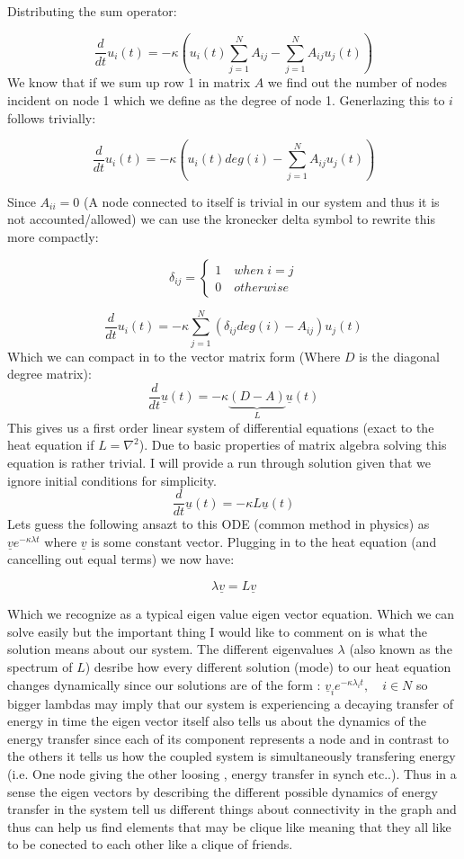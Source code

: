 \documentclass[10pt,twocolumn]{article}
\begin{document}
Distributing the sum operator:

\[
\frac{d}{dt}u_{i}(t) = -\kappa \left( u_{i}(t) \sum_{j=1}^{N}A_{ij}-  \sum_{j=1}^{N}A_{ij}u_{j}(t) \right )
\]
We know that if we sum up row 1 in matrix $A$ we find out the number of nodes incident on node 1 which we define as the degree of node 1. Generlazing this to $i$ follows trivially:

\[
\frac{d}{dt}u_{i}(t) = -\kappa \left( u_{i}(t) deg(i)-  \sum_{j=1}^{N}A_{ij}u_{j}(t) \right )
\]

Since $A_{ii}=0$  (A node connected to itself is trivial in our system and thus it is not accounted/allowed) we can use the kronecker delta symbol to rewrite this more compactly:

\[ \delta_{ij} = \begin{cases} 
   1 \quad when \; i = j \\
   0 \quad otherwise 
   \end{cases}
\]

\[
\frac{d}{dt}u_{i}(t) = -\kappa \sum_{j=1}^{N}(\delta_{ij} deg(i) -A_{ij})u_{j}(t)
\]
Which we can compact in to the vector matrix form (Where $D$ is the diagonal degree matrix):
\[
\frac{d}{dt}\underline{u}(t) = -\kappa\underbrace{(D -A)}_{L}\underline{u}(t)
\]
This gives us a first order linear system of differential equations (exact to the heat equation if $L = \nabla^{2}$). Due to basic properties of matrix algebra solving this equation is rather trivial. I will provide a run through solution given that we ignore initial conditions for simplicity.
\[
\frac{d}{dt}\underline{u}(t) = -\kappa L\underline{u}(t)
\]
Lets guess the following ansazt to this ODE (common method in physics) as $\underline{v}e^{-\kappa\lambda t}$ where $\underline{v}$ is some constant vector. Plugging in to the heat equation (and cancelling out equal terms) we now have:

\[
 \lambda \underline{v} = L \underline{v}
\]

Which we recognize as a typical eigen value eigen vector equation. Which we can solve easily but the important thing I would like to comment on is what the solution means about our system. The different eigenvalues $\lambda$ (also known as the spectrum of $L$) desribe how every different solution (mode) to our heat equation changes dynamically since our solutions are of the form :  $\underline{v}_{i}e^{-\kappa\lambda_{i} t}, \quad i \in N$ so bigger lambdas may imply that our system is experiencing a decaying transfer of energy in time the eigen vector itself also tells us about the dynamics of the energy transfer since each of its component represents a node and in contrast to the others it tells us how the coupled system is simultaneously transfering energy (i.e. One node giving the other loosing , energy transfer in synch etc..). Thus in a sense the eigen vectors by describing the different possible dynamics of energy transfer in the system tell us different things about connectivity in the graph and thus can  help us find elements that may be clique like meaning that they all like to be conected to each other like a clique of friends.
\end{document}
